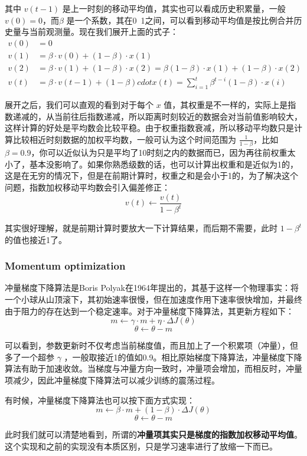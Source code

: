 \documentclass[12pt]{article}
\begin{document}
其中 $v(t-1)$ 是上一时刻的移动平均值，其实也可以看成历史积累量，一般 $v(0) = 0$，而$\beta$ 是一个系数，其在0~1之间，可以看到移动平均值是按比例合并历史量与当前观测量。现在我们展开上面的式子：
\begin{align*}
v(0) &= 0 \\
v(1) &= \beta \cdot v(0) + (1-\beta)\cdot x(1) \\
v(2) &= \beta \cdot v(1) + (1-\beta)\cdot x(2) = \beta(1-\beta)\cdot x(1) + (1-\beta)\cdot x(2) \\
v(t) &= \beta\cdot v(t-1) + (1-\beta) cdot x(t) = \sum_{i=1}^t\beta^{t-i}(1-\beta)\cdot x(i)
\end{align*}

展开之后，我们可以直观的看到对于每个 $x$ 值，其权重是不一样的，实际上是指数递减的，从当前往后指数递减，所以距离时刻较近的数据会对当前值影响较大，这样计算的好处是平均数会比较平稳。由于权重指数衰减，所以移动平均数只是计算比较相近时刻数据的加权平均数，一般可认为这个时间范围为 $\frac{1}{1-\beta}$，比如 $\beta = 0.9$，你可以近似认为只是平均了10时刻之内的数据而已，因为再往前权重太小了，基本没影响了。如果你熟悉级数的话，也可以计算出权重和是近似为1的，这是在无穷的情况下，但是在前期计算时，权重之和是会小于1的，为了解决这个问题，指数加权移动平均数会引入偏差修正：
$$
v(t) \leftarrow \frac{v(t)}{1-\beta^t}
$$

其实很好理解，就是前期计算时要放大一下计算结果，而后期不需要，此时 $1-\beta^t$ 的值也接近1了。

\subsubsection{Momentum optimization}
冲量梯度下降算法是Boris Polyak在1964年提出的，其基于这样一个物理事实：将一个小球从山顶滚下，其初始速率很慢，但在加速度作用下速率很快增加，并最终由于阻力的存在达到一个稳定速率。对于冲量梯度下降算法，其更新方程如下：
$$
m \leftarrow \gamma \cdot m + \eta \cdot \Delta J(\theta)
$$
$$
\theta \leftarrow \theta - m
$$

可以看到，参数更新时不仅考虑当前梯度值，而且加上了一个积累项（冲量），但多了一个超参 $\gamma$ ，一般取接近1的值如0.9。相比原始梯度下降算法，冲量梯度下降算法有助于加速收敛。当梯度与冲量方向一致时，冲量项会增加，而相反时，冲量项减少，因此冲量梯度下降算法可以减少训练的震荡过程。

有时候，冲量梯度下降算法也可以按下面方式实现：
$$
m \leftarrow \beta \cdot m + (1-\beta) \cdot \Delta J(\theta)
$$
$$
\theta \leftarrow \theta - m
$$

此时我们就可以清楚地看到，所谓的\textbf{冲量项其实只是梯度的指数加权移动平均值}。这个实现和之前的实现没有本质区别，只是学习速率进行了放缩一下而已。
\end{document}
